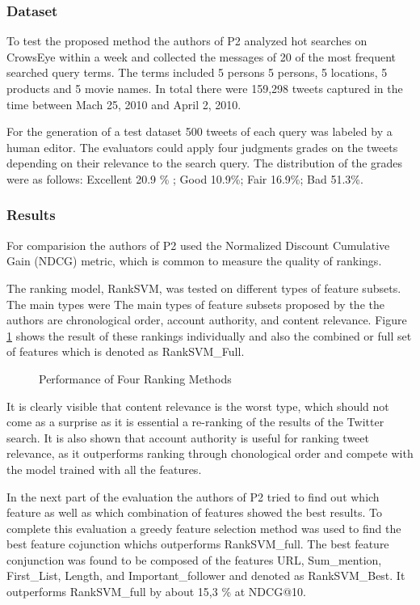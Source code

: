 \documentclass{proseminar}
\begin{document}
\subsubsection*{Dataset}
To test the proposed method the authors of P2 analyzed hot searches on CrowsEye within a week and collected the messages of 20 of the most frequent searched query terms. The terms included 5 persons 5 persons, 5 locations, 5 products and 5 movie names. 
In total there were 159,298 tweets captured in the time between Mach 25, 2010 and April 2, 2010.

For the generation of a test dataset 500 tweets of each query was labeled by a human editor. The evaluators could apply four judgments grades on the tweets depending on their relevance to the search query. 
The distribution of the grades were as follows: Excellent 20.9 \% ; Good 10.9\%; Fair 16.9\%; Bad 51.3\%.


\subsubsection*{Results}
For comparision the authors of P2 used the Normalized Discount Cumulative Gain (NDCG) metric, which is common to measure the quality of rankings.

The ranking model, RankSVM, was tested on different types of feature subsets. The main types were 
The main types of feature subsets proposed by the the authors are chronological order, account authority, and content relevance. Figure \ref{fig:ranking} shows the result of these rankings individually and also the combined or full set of features which is denoted as RankSVM\_Full.

\begin{figure}[h]
\centering
{}
\caption{Performance of Four Ranking Methods}
\label{fig:ranking}
\end{figure}

It is clearly visible that content relevance is the worst type, which should not come as a surprise as it is essential a re-ranking of the results of the Twitter search. It is also shown that account authority is useful for ranking tweet relevance, as it outperforms ranking through chonological order and compete with the model trained with all the features.

In the next part of the evaluation the authors of P2 tried to find out which feature as well as which combination of features showed the best results.
To complete this evaluation a greedy feature selection method was used to find the best feature cojunction whichs outperforms RankSVM\_full. The best feature conjunction was found to be composed of the features URL, Sum\_mention, First\_List, Length, and Important\_follower and denoted as RankSVM\_Best. It outperforms RankSVM\_full by about 15,3 \% at NDCG@10.
\end{document}

